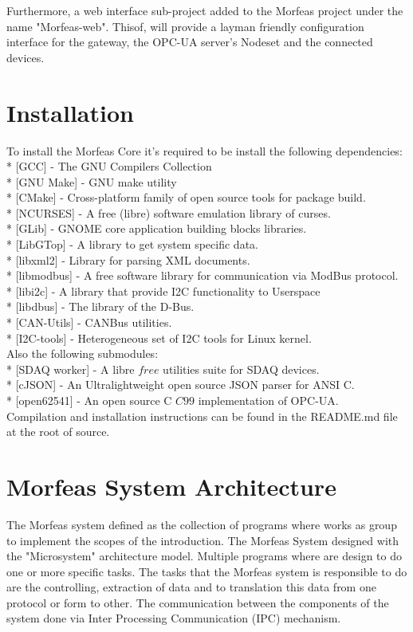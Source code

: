 \documentclass{article}
\begin{document}
Furthermore, a web interface sub-project added to the Morfeas project under the name "Morfeas-web".
Thisof, will provide a layman friendly configuration interface for the gateway, the OPC-UA server's Nodeset and the connected devices.

\section{Installation}
To install the Morfeas Core it's required to be install the following dependencies:\\
* [GCC] - The GNU Compilers Collection\\
* [GNU Make] - GNU make utility\\
* [CMake] - Cross-platform family of open source tools for package build.\\
* [NCURSES] - A free (libre) software emulation library of curses.\\
* [GLib] - GNOME core application building blocks libraries.\\
* [LibGTop] - A library to get system specific data.\\
* [libxml2] - Library for parsing XML documents.\\
* [libmodbus] - A free software library for communication via ModBus protocol.\\
* [libi2c] - A library that provide I2C functionality to Userspace\\
* [libdbus] - The library of the D-Bus.\\
* [CAN-Utils] - CANBus utilities.\\
* [I2C-tools] - Heterogeneous set of I2C tools for Linux kernel.\\
Also the following submodules:\\
* [SDAQ worker] - A libre \(free\) utilities suite for SDAQ devices.\\
* [cJSON] - An Ultralightweight open source JSON parser for ANSI C.\\
* [open62541] - An open source C \(C99\) implementation of OPC-UA.\\

Compilation and installation instructions can be found in the README.md file at the root of source.

\section{Morfeas System Architecture}
The Morfeas system defined as the collection of programs where works as group to implement the scopes of the introduction.
The Morfeas System designed with the "Microsystem" architecture model. Multiple programs where are design to do one or more specific tasks.
The tasks that the Morfeas system is responsible to do are the controlling, extraction of data and to translation this data from one protocol or form to other.
The communication between the components of the system done via Inter Processing Communication (IPC) mechanism.
\end{document}
